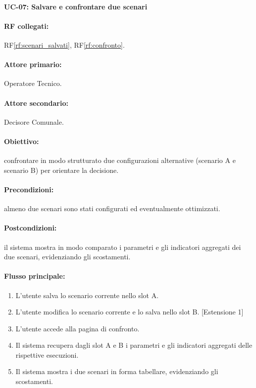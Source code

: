 \paragraph{\large UC-07: Salvare e confrontare due scenari}

\paragraph{RF collegati:} RF\ref{rf:scenari_salvati}, RF\ref{rf:confronto}.

\paragraph{Attore primario:} Operatore Tecnico.

\paragraph{Attore secondario:} Decisore Comunale.

\paragraph{Obiettivo:} confrontare in modo strutturato due configurazioni alternative (scenario A e scenario B) per orientare la decisione.

\paragraph{Precondizioni:} almeno due scenari sono stati configurati ed eventualmente ottimizzati.

\paragraph{Postcondizioni:} il sistema mostra in modo comparato i parametri e gli indicatori aggregati dei due scenari, evidenziando gli scostamenti.

\paragraph{Flusso principale:}
\begin{enumerate}
    \item L'utente salva lo scenario corrente nello slot A.
    \item L'utente modifica lo scenario corrente e lo salva nello slot B. [Estensione 1]
    \item L'utente accede alla pagina di confronto.
    \item Il sistema recupera dagli slot A e B i parametri e gli indicatori aggregati delle rispettive esecuzioni.
    \item Il sistema mostra i due scenari in forma tabellare, evidenziando gli scostamenti.
\end{enumerate}

